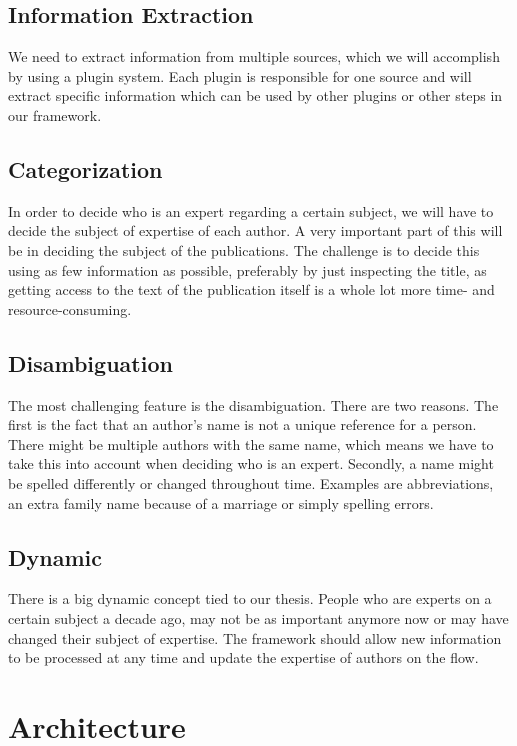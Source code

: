 \subsection{Information Extraction}

We need to extract information from multiple sources, which we will accomplish by using a plugin system. Each plugin is responsible for one source and will extract specific information which can be used by other plugins or other steps in our framework.

\subsection{Categorization}

In order to decide who is an expert regarding a certain subject, we will have to decide the subject of expertise of each author. A very important part of this will be in deciding the subject of the publications. The challenge is to decide this using as few information as possible, preferably by just inspecting the title, as getting access to the text of the publication itself is a whole lot more time- and resource-consuming.

\subsection{Disambiguation}

The most challenging feature is the disambiguation. There are two reasons. The first is the fact that an author's name is not a unique reference for a person. There might be multiple authors with the same name, which means we have to take this into account when deciding who is an expert. Secondly, a name might be spelled differently or changed throughout time. Examples are abbreviations, an extra family name because of a marriage or simply spelling errors.

\subsection{Dynamic}

There is a big dynamic concept tied to our thesis. People who are experts on a certain subject a decade ago, may not be as important anymore now or may have changed their subject of expertise. The framework should allow new information to be processed at any time and update the expertise of authors on the flow.

\section{Architecture}

